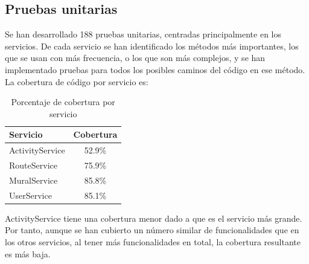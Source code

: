 \subsection{Pruebas unitarias}
Se han desarrollado 188 pruebas unitarias, centradas principalmente en los servicios. De cada servicio se han identificado los métodos más importantes, los que se usan con más frecuencia, o los que son más complejos, y se han implementado pruebas para todos los posibles caminos del código en ese método. La cobertura de código por servicio es:
\begin{table}[H]
\centering
\begin{tabular}{l c}
\hline
\textbf{Servicio} & \textbf{Cobertura} \\
\hline
ActivityService & 52.9\% \\
RouteService    & 75.9\% \\
MuralService    & 85.8\% \\
UserService     & 85.1\% \\
\hline
\end{tabular}
\caption{Porcentaje de cobertura por servicio}
\label{tab:cobertura-servicios}
\end{table}
ActivityService tiene una cobertura menor dado a que es el servicio más grande. Por tanto, aunque se han cubierto un número similar de funcionalidades que en los otros servicios, al tener más funcionalidades en total, la cobertura resultante es más baja.

